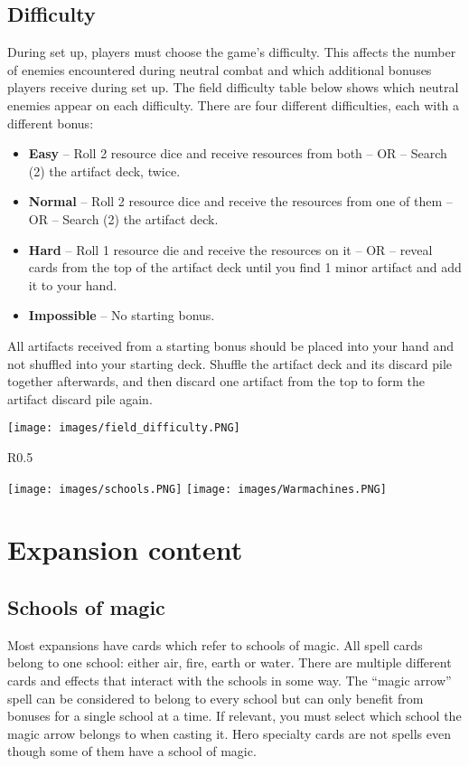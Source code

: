 \documentclass[12pt]{article}
\begin{document}
\subsection*{\hypertarget{Difficulty}{Difficulty}}
During set up, players must choose the game’s difficulty. This affects the number of enemies
encountered during neutral combat and which additional bonuses players receive during set up. The field difficulty table below shows which neutral enemies appear on each difficulty. There are four different difficulties, each with a different bonus:
\begin{itemize}
    \item \textbf{Easy} – Roll 2 resource dice and receive resources from both – OR – Search (2) the artifact deck, twice.
    \item \textbf{Normal} – Roll 2 resource dice and receive the resources from one of them – OR – Search (2) the artifact deck.
    \item \textbf{Hard} – Roll 1 resource die and receive the resources on it – OR – reveal cards from the top of the artifact deck until you find 1 minor artifact and add it to your hand.
    \item \textbf{Impossible} – No starting bonus.
\end{itemize}
All artifacts received from a starting bonus should be placed into your hand and not shuffled into your starting deck. Shuffle the artifact deck and its discard pile together afterwards, and then discard one artifact from the top to form the artifact discard pile again.
\begin{center}
\texttt{[image: images/field\_difficulty.PNG]}
\end{center}
\clearpage
\begin{wrapfigure}{R}{0.5\textwidth}
    \begin{center}
    \texttt{[image: images/schools.PNG]}
    \texttt{[image: images/Warmachines.PNG]}
    \end{center}
\end{wrapfigure}
\section{Expansion content}
\subsection*{Schools of magic}
Most expansions have cards which refer to schools of magic. All spell cards belong to one school: either air, fire, earth or water. There are multiple different cards and effects that interact with the schools in some way. The “magic arrow” spell can be considered to belong to every school but can only benefit from bonuses for a single school at a time. If relevant, you must select which school the magic arrow belongs to when casting it. Hero specialty cards are not spells even though some of them have a school of magic.
\end{document}
